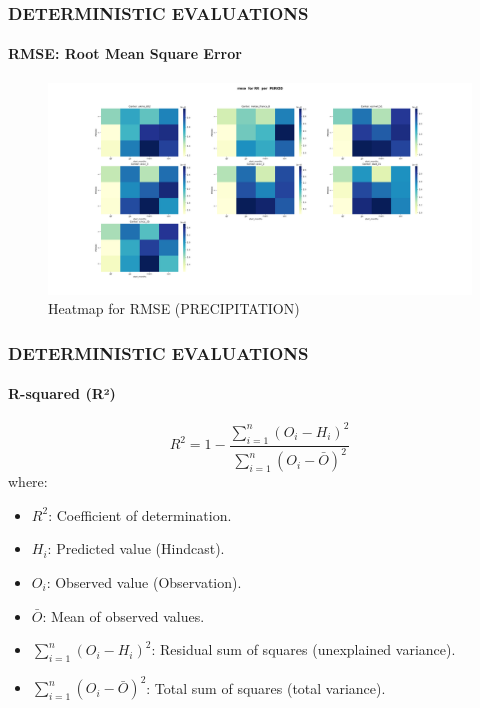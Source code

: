 \begin{frame}
\frametitle{DETERMINISTIC EVALUATIONS}
\framesubtitle{RMSE: Root Mean Square Error}
\begin{figure}[H]
    \centering
    \includegraphics[width=1\linewidth]{rmse_RR_ PERIOD.png}
    \caption{Heatmap for RMSE (PRECIPITATION)}
    \label{fig:rmse-heatmap}
\end{figure}
\end{frame}

\begin{frame}
\frametitle{DETERMINISTIC EVALUATIONS}
\framesubtitle{R-squared (R²)}

\[
R^2 = 1 - \frac{\sum_{i=1}^n (O_i - H_i)^2}{\sum_{i=1}^n (O_i - \bar{O})^2}
\]
where:
\begin{itemize}
    \item \( R^2 \): Coefficient of determination.
    \item \( H_i \): Predicted value (Hindcast).
    \item \( O_i \): Observed value (Observation).
    \item \( \bar{O} \): Mean of observed values.
    \item \( \sum_{i=1}^n (O_i - H_i)^2 \): Residual sum of squares (unexplained variance).
    \item \( \sum_{i=1}^n (O_i - \bar{O})^2 \): Total sum of squares (total variance).
\end{itemize}
\end{frame}

